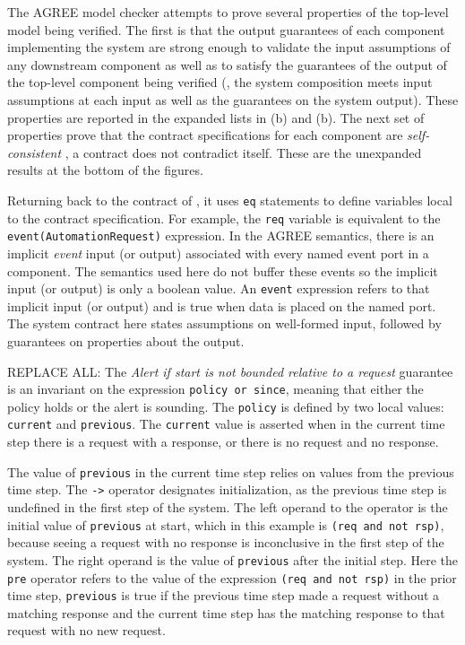 The AGREE model checker attempts to prove several properties of the top-level model being verified.
The first is that the output guarantees of each component implementing the system are strong enough to validate the input assumptions of any downstream component as well as to satisfy the guarantees of the output of the top-level component being verified (\ie, the system composition meets input assumptions at each input as well as the guarantees on the system output).
These properties are reported in the expanded lists in (b) and (b).
The next set of properties prove that the contract specifications for each component are \emph{self-consistent} \ie, a contract does not contradict itself.
These are the unexpanded results at the bottom of the figures.

Returning back to the contract of , it uses \texttt{eq} statements to define variables local to the contract specification.
For example, the \texttt{req} variable is equivalent to the \texttt{event(AutomationRequest)} expression.
In the AGREE semantics, there is an implicit \emph{event} input (or output) associated with every named event port in a component.
The semantics used here do not buffer these events so the implicit input (or output) is only a boolean value.
An \texttt{event} expression refers to that implicit input (or output) and is true when data is placed on the named port.
The system contract here states assumptions on well-formed input, followed by guarantees on properties about the output.

REPLACE ALL: 
The \emph{Alert if start is not bounded relative to a request} guarantee is an invariant on the expression \texttt{policy or since}, meaning that either the policy holds or the alert is sounding.
The \texttt{policy} is defined by two local values: \texttt{current} and \texttt{previous}.
The \texttt{current} value is asserted when in the current time step there is a request with a response, or there is no request and no response.

The value of \texttt{previous} in the current time step relies on values from the previous time step.
The \texttt{->} operator designates initialization, as the previous time step is undefined in the first step of the system.
The left operand to the operator is the initial value of \texttt{previous} at start, which in this example is \texttt{(req and not rsp)}, because seeing a request with no response is inconclusive in the first step of the system.
The right operand is the value of \texttt{previous} after the initial step.
Here the \texttt{pre} operator refers to the value of the expression \texttt{(req and not rsp)} in the prior time step, \texttt{previous} is true if the previous time step made a request without a matching response and the current time step has the matching response to that request with no new request.

